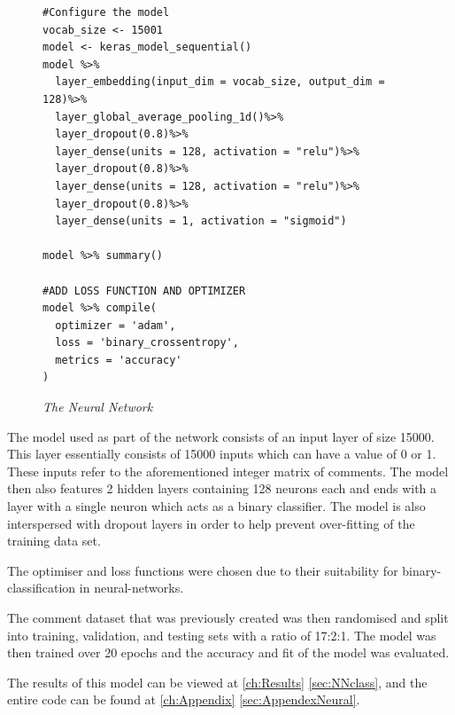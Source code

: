 \begin{figure}[H]
\begin{lstlisting}
#Configure the model
vocab_size <- 15001
model <- keras_model_sequential()
model %>% 
  layer_embedding(input_dim = vocab_size, output_dim = 128)%>%
  layer_global_average_pooling_1d()%>%
  layer_dropout(0.8)%>%
  layer_dense(units = 128, activation = "relu")%>%
  layer_dropout(0.8)%>%
  layer_dense(units = 128, activation = "relu")%>%
  layer_dropout(0.8)%>%
  layer_dense(units = 1, activation = "sigmoid")

model %>% summary()

#ADD LOSS FUNCTION AND OPTIMIZER
model %>% compile(
  optimizer = 'adam',
  loss = 'binary_crossentropy',
  metrics = 'accuracy'
)
\end{lstlisting}
\caption{\textit{The Neural Network}}
\label{fig:KerasModel}
\end{figure}

The model used as part of the network consists of an input layer of size 15000. This layer essentially consists of 15000 inputs which can have a value of 0 or 1. These inputs refer to the aforementioned integer matrix of comments. The model then also features 2 hidden layers containing 128 neurons each and ends with a layer with a single neuron which acts as a binary classifier. The model is also interspersed with dropout layers in order to help prevent over-fitting of the training data set.

The optimiser and loss functions were chosen due to their suitability for binary-classification in neural-networks. \cite{19, 20}

The comment dataset that was previously created was then randomised and split into training, validation, and testing sets with a ratio of 17:2:1. The model was then trained over 20 epochs and the accuracy and fit of the model was evaluated.

The results of this model can be viewed at \autoref{ch:Results} \autoref{sec:NNclass}, and the entire code can be found at \autoref{ch:Appendix} \autoref{sec:AppendexNeural}.


